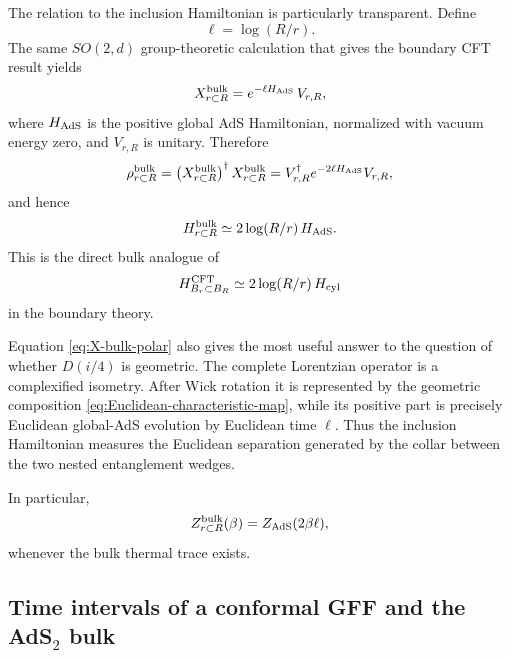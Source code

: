 \documentclass[a4paper,11pt]{article}
\theoremstyle{definition}
\begin{document}
The relation to the inclusion Hamiltonian is particularly transparent.
Define
\begin{equation}
    \ell=\log(R/r).
    \label{eq:ell-ball}
\end{equation}
The same $SO(2,d)$ group-theoretic calculation that gives the boundary
CFT result yields
\begin{equation}
    X^{\rm bulk}_{r\subset R}
    =
    e^{-\ell H_{\rm AdS}}\,
    V_{r,R},
    \label{eq:X-bulk-polar}
\end{equation}
where $H_{\rm AdS}$ is the positive global AdS Hamiltonian, normalized
with vacuum energy zero, and $V_{r,R}$ is unitary. Therefore
\begin{equation}
    \rho^{\rm bulk}_{r\subset R}
    =
    \left(X^{\rm bulk}_{r\subset R}\right)^\dagger
    X^{\rm bulk}_{r\subset R}
    =
    V_{r,R}^\dagger
    e^{-2\ell H_{\rm AdS}}
    V_{r,R},
    \label{eq:rho-bulk-ball}
\end{equation}
and hence
\begin{equation}
    H^{\rm bulk}_{r\subset R}
    \simeq
    2\log(R/r)\,H_{\rm AdS}.
    \label{eq:H-bulk-ball}
\end{equation}
This is the direct bulk analogue of
\begin{equation}
    H^{\rm CFT}_{B_r\subset B_R}
    \simeq
    2\log(R/r)\,H_{\rm cyl}
\end{equation}
in the boundary theory.

Equation \eqref{eq:X-bulk-polar} also gives the most useful answer to the
question of whether $D(i/4)$ is geometric. The complete Lorentzian
operator is a complexified isometry. After Wick rotation it is represented
by the geometric composition \eqref{eq:Euclidean-characteristic-map},
while its positive part is precisely Euclidean global-AdS evolution by
Euclidean time $\ell$. Thus the inclusion Hamiltonian measures the
Euclidean separation generated by the collar between the two nested
entanglement wedges.

In particular,
\begin{equation}
    Z^{\rm bulk}_{r\subset R}(\beta)
    =
    Z_{\rm AdS}(2\beta\ell),
    \label{eq:bulk-ball-partition}
\end{equation}
whenever the bulk thermal trace exists.

\subsection{Time intervals of a conformal GFF and the AdS$_2$ bulk}
\end{document}
